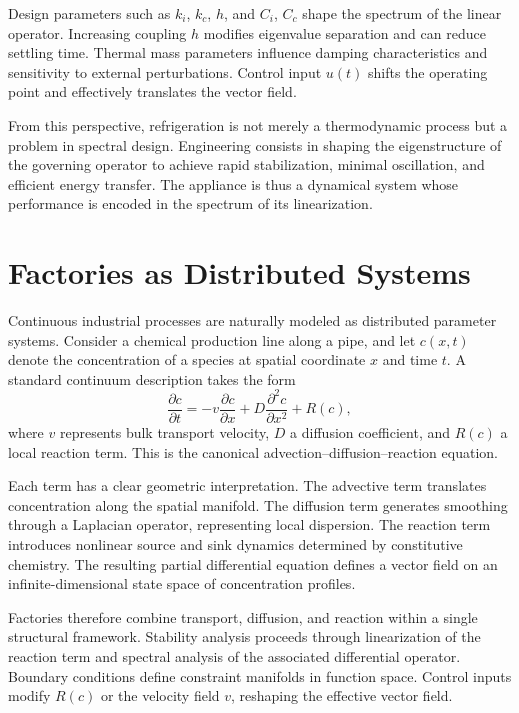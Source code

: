 \documentclass[12pt]{book}
\begin{document}
Design parameters such as $k_i$, $k_c$, $h$, and $C_i$, $C_c$ shape the
spectrum of the linear operator. Increasing coupling $h$ modifies
eigenvalue separation and can reduce settling time. Thermal mass
parameters influence damping characteristics and sensitivity to
external perturbations. Control input $u(t)$ shifts the operating point
and effectively translates the vector field.

From this perspective, refrigeration is not merely a thermodynamic
process but a problem in spectral design. Engineering consists in
shaping the eigenstructure of the governing operator to achieve rapid
stabilization, minimal oscillation, and efficient energy transfer.
The appliance is thus a dynamical system whose performance is encoded
in the spectrum of its linearization.

\section{Factories as Distributed Systems}

Continuous industrial processes are naturally modeled as distributed
parameter systems. Consider a chemical production line along a pipe,
and let $c(x,t)$ denote the concentration of a species at spatial
coordinate $x$ and time $t$. A standard continuum description takes
the form
\[
\frac{\partial c}{\partial t}
=
- v \frac{\partial c}{\partial x}
+
D \frac{\partial^2 c}{\partial x^2}
+
R(c),
\]
where $v$ represents bulk transport velocity, $D$ a diffusion
coefficient, and $R(c)$ a local reaction term. This is the canonical
advection--diffusion--reaction equation.

Each term has a clear geometric interpretation. The advective term
translates concentration along the spatial manifold. The diffusion
term generates smoothing through a Laplacian operator, representing
local dispersion. The reaction term introduces nonlinear source and
sink dynamics determined by constitutive chemistry. The resulting
partial differential equation defines a vector field on an
infinite-dimensional state space of concentration profiles.

Factories therefore combine transport, diffusion, and reaction within
a single structural framework. Stability analysis proceeds through
linearization of the reaction term and spectral analysis of the
associated differential operator. Boundary conditions define
constraint manifolds in function space. Control inputs modify $R(c)$
or the velocity field $v$, reshaping the effective vector field.
\end{document}
